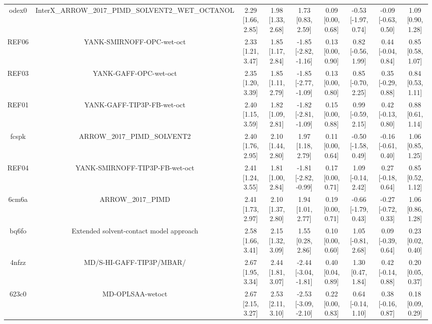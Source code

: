 \documentclass{article}
\begin{document}
\begin{center}
\begin{longtable}{|ccccccccc|}
 odex0 &  InterX\_ARROW\_2017\_PIMD\_SOLVENT2\_WET\_OCTANOL &  2.29 [1.66, 2.85] &  1.98 [1.33, 2.68] &     1.73 [0.83, 2.59] &  0.09 [0.00, 0.68] &  -0.53 [-1.97, 0.74] &  -0.09 [-0.63, 0.50] &     1.09 [0.90, 1.28] \\
 REF06 &                          YANK-SMIRNOFF-OPC-wet-oct &  2.33 [1.21, 3.47] &  1.85 [1.17, 2.84] &  -1.85 [-2.82, -1.16] &  0.13 [0.00, 0.90] &   0.82 [-0.56, 1.99] &   0.44 [-0.04, 0.84] &     0.85 [0.58, 1.07] \\
 REF03 &                              YANK-GAFF-OPC-wet-oct &  2.35 [1.20, 3.39] &  1.85 [1.11, 2.79] &  -1.85 [-2.77, -1.09] &  0.13 [0.00, 0.80] &   0.85 [-0.70, 2.25] &   0.35 [-0.29, 0.88] &     0.84 [0.53, 1.11] \\
 REF01 &                         YANK-GAFF-TIP3P-FB-wet-oct &  2.40 [1.15, 3.59] &  1.82 [1.09, 2.81] &  -1.82 [-2.81, -1.09] &  0.15 [0.00, 0.88] &   0.99 [-0.59, 2.15] &   0.42 [-0.13, 0.80] &     0.88 [0.61, 1.14] \\
 fcspk &                        ARROW\_2017\_PIMD\_SOLVENT2 &  2.40 [1.76, 2.95] &  2.10 [1.44, 2.80] &     1.97 [1.18, 2.79] &  0.11 [0.00, 0.64] &  -0.50 [-1.58, 0.49] &  -0.16 [-0.61, 0.40] &     1.06 [0.85, 1.25] \\
 REF04 &                     YANK-SMIRNOFF-TIP3P-FB-wet-oct &  2.41 [1.24, 3.55] &  1.81 [1.00, 2.84] &  -1.81 [-2.82, -0.99] &  0.17 [0.00, 0.71] &   1.09 [-0.14, 2.42] &   0.27 [-0.18, 0.64] &     0.85 [0.52, 1.12] \\
 6cm6a &                                  ARROW\_2017\_PIMD &  2.41 [1.73, 2.97] &  2.10 [1.37, 2.80] &     1.94 [1.01, 2.77] &  0.19 [0.00, 0.71] &  -0.66 [-1.79, 0.43] &  -0.27 [-0.72, 0.33] &     1.06 [0.86, 1.28] \\
 bq6fo &            Extended solvent-contact model approach &  2.58 [1.66, 3.41] &  2.15 [1.32, 3.09] &     1.55 [0.28, 2.86] &  0.10 [0.00, 0.60] &   1.05 [-0.81, 2.68] &   0.09 [-0.39, 0.64] &     0.23 [0.02, 0.40] \\
 4nfzz &                           MD/S-HI-GAFF-TIP3P/MBAR/ &  2.67 [1.95, 3.34] &  2.44 [1.81, 3.07] &  -2.44 [-3.04, -1.81] &  0.40 [0.04, 0.89] &    1.30 [0.47, 1.84] &   0.42 [-0.14, 0.88] &     0.20 [0.05, 0.37] \\
 623c0 &                                   MD-OPLSAA-wetoct &  2.67 [2.15, 3.27] &  2.53 [2.11, 3.10] &  -2.53 [-3.09, -2.10] &  0.22 [0.00, 0.83] &   0.64 [-0.14, 1.10] &   0.38 [-0.16, 0.87] &     0.18 [0.09, 0.29] \\

\end{longtable}
\end{center}
\end{document}

